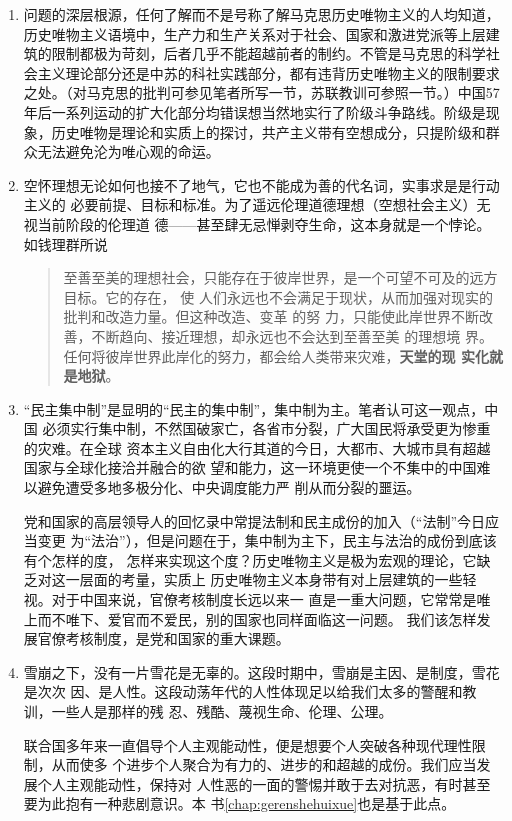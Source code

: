 \begin{enumerate}
\item 问题的深层根源，任何了解而不是号称了解马克思历史唯物主义的人均知道，历史唯物主义语境中，生产力和生产关系对于社会、国家和激进党派等上层建筑的限制都极为苛刻，后者几乎不能超越前者的制约。不管是马克思的科学社会主义理论部分还是中苏的科社实践部分，都有违背历史唯物主义的限制要求之处。（对马克思的批判可参见笔者所写一节，苏联教训可参照一节。）中国57年后一系列运动的扩大化部分均错误想当然地实行了阶级斗争路线。阶级是现象，历史唯物是理论和实质上的探讨，共产主义带有空想成分，只提阶级和群众无法避免沦为唯心观的命运。

\item 空怀理想无论如何也接不了地气，它也不能成为善的代名词，实事求是是行动主义的
  必要前提、目标和标准。为了遥远伦理道德理想（空想社会主义）无视当前阶段的伦理道
  德——甚至肆无忌惮剥夺生命，这本身就是一个悖论。如钱理群所说
  \begin{quotation}
    至善至美的理想社会，只能存在于彼岸世界，是一个可望不可及的远方目标。它的存在，
    使 人们永远也不会满足于现状，从而加强对现实的批判和改造力量。但这种改造、变革
    的努 力，只能使此岸世界不断改善，不断趋向、接近理想，却永远也不会达到至善至美
    的理想境 界。任何将彼岸世界此岸化的努力，都会给人类带来灾难，\textbf{天堂的现
      实化就是地狱}。
  \end{quotation}

\item “民主集中制”是显明的“民主的集中制”，集中制为主。笔者认可这一观点，中国
  必须实行集中制，不然国破家亡，各省市分裂，广大国民将承受更为惨重的灾难。在全球
  资本主义自由化大行其道的今日，大都市、大城市具有超越国家与全球化接洽并融合的欲
  望和能力，这一环境更使一个不集中的中国难以避免遭受多地多极分化、中央调度能力严
  削从而分裂的噩运。

  党和国家的高层领导人的回忆录中常提法制和民主成份的加入（“法制”今日应当变更
  为“法治”），但是问题在于，集中制为主下，民主与法治的成份到底该有个怎样的度，
  怎样来实现这个度？历史唯物主义是极为宏观的理论，它缺乏对这一层面的考量，实质上
  历史唯物主义本身带有对上层建筑的一些轻视。对于中国来说，官僚考核制度长远以来一
  直是一重大问题，它常常是唯上而不唯下、爱官而不爱民，别的国家也同样面临这一问题。
  我们该怎样发展官僚考核制度，是党和国家的重大课题。

\item 雪崩之下，没有一片雪花是无辜的。这段时期中，雪崩是主因、是制度，雪花是次次
  因、是人性。这段动荡年代的人性体现足以给我们太多的警醒和教训，一些人是那样的残
  忍、残酷、蔑视生命、伦理、公理。

  联合国多年来一直倡导个人主观能动性，便是想要个人突破各种现代理性限制，从而使多
  个进步个人聚合为有力的、进步的和超越的成份。我们应当发展个人主观能动性，保持对
  人性恶的一面的警惕并敢于去对抗恶，有时甚至要为此抱有一种悲剧意识。本
  书\cref{chap:gerenshehuixue}也是基于此点。
\end{enumerate}

